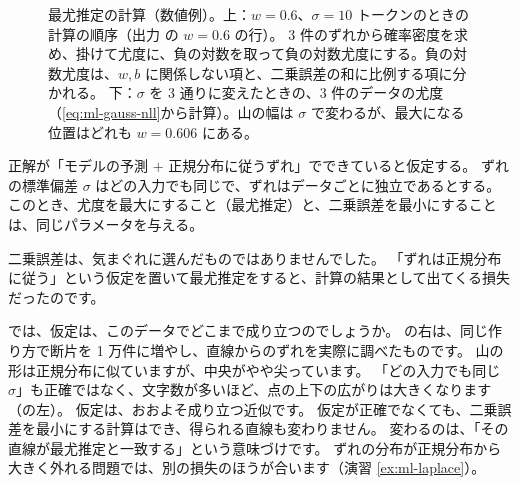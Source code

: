 \begin{figure}[tbp]
\vspace{2mm}
\caption{最尤推定の計算（数値例）。上：$w=0.6$、$\sigma=10$ トークンのときの計算の順序（出力  の $w=0.6$ の行）。
3 件のずれから確率密度を求め、掛けて尤度に、負の対数を取って負の対数尤度にする。負の対数尤度は、$w,b$ に関係しない項と、二乗誤差の和に比例する項に分かれる。
下：$\sigma$ を 3 通りに変えたときの、3 件のデータの尤度（\eqref{eq:ml-gauss-nll}から計算）。山の幅は $\sigma$ で変わるが、最大になる位置はどれも $w=0.606$ にある。}
\label{fig:ml-mle-numbers}
\end{figure}

\begin{theorem}[二乗誤差と最尤推定]\label{thm:ml-mse-mle}
正解が「モデルの予測 $+$ 正規分布に従うずれ」でできていると仮定する。
ずれの標準偏差 $\sigma$ はどの入力でも同じで、ずれはデータごとに独立であるとする。
このとき、尤度を最大にすること（最尤推定）と、二乗誤差を最小にすることは、同じパラメータを与える。
\end{theorem}

二乗誤差は、気まぐれに選んだものではありませんでした。
「ずれは正規分布に従う」という仮定を置いて最尤推定をすると、計算の結果として出てくる損失だったのです。

では、仮定は、このデータでどこまで成り立つのでしょうか。
の右は、同じ作り方で断片を 1 万件に増やし、直線からのずれを実際に調べたものです。
山の形は正規分布に似ていますが、中央がやや尖っています。
「どの入力でも同じ $\sigma$」も正確ではなく、文字数が多いほど、点の上下の広がりは大きくなります（の左）。
仮定は、おおよそ成り立つ近似です。
仮定が正確でなくても、二乗誤差を最小にする計算はでき、得られる直線も変わりません。
変わるのは、「その直線が最尤推定と一致する」という意味づけです。
ずれの分布が正規分布から大きく外れる問題では、別の損失のほうが合います（演習 \ref{ex:ml-laplace}）。

